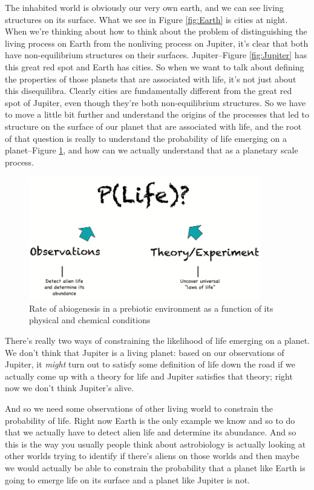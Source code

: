 \documentclass[]{article}
\begin{document}
The inhabited world is obviously our very own earth, and we can see living structures on its surface. What we see in Figure \ref{fig:Earth} is cities at night. When we're
thinking about how to think about the problem of distinguishing the living process on Earth from the nonliving process on Jupiter, it's clear that both have non-equilibrium structures on their surfaces. Jupiter--Figure \ref{fig:Jupiter} has this great red spot and Earth has cities. So when we want to talk about defining the properties of those planets that are associated with life, it's not just about this disequilibra. Clearly cities are fundamentally different from the great red spot of Jupiter, even though they're both non-equilibrium structures. So we have to move a little bit further and understand the origins of the processes that led to structure on the surface of our planet that are associated with life, and the root of that question is really to understand the probability of life emerging on a planet--Figure \ref{fig:P:Life}, and how can we actually understand that as a planetary scale process. 

\begin{figure}[H]
	\caption[Rate of abiogenesis in a prebiotic environment]{Rate of abiogenesis in a prebiotic environment as a function of its physical and chemical conditions}\label{fig:P:Life}
	\includegraphics[width=0.9\textwidth]{P_Life}
\end{figure}


There's really two ways of constraining the likelihood of life emerging on a planet. We don't think that Jupiter is a living planet:
based on our observations of Jupiter, it \emph{might} turn out to satisfy some definition of life down the road if we actually come up with a theory for life and Jupiter satisfies that theory; right now we don't think Jupiter's alive.

And so we need some observations of other living world to constrain the probability of life. Right now Earth is the only example we know and so to do that we actually have to detect alien life and determine its abundance. And so this is the way you usually people think about astrobiology is actually looking at other worlds trying to identify if there's aliens on those worlds and then maybe we would actually be able to constrain the probability that a planet like Earth is going to emerge life on its surface and a planet like Jupiter is not. 
\end{document}
